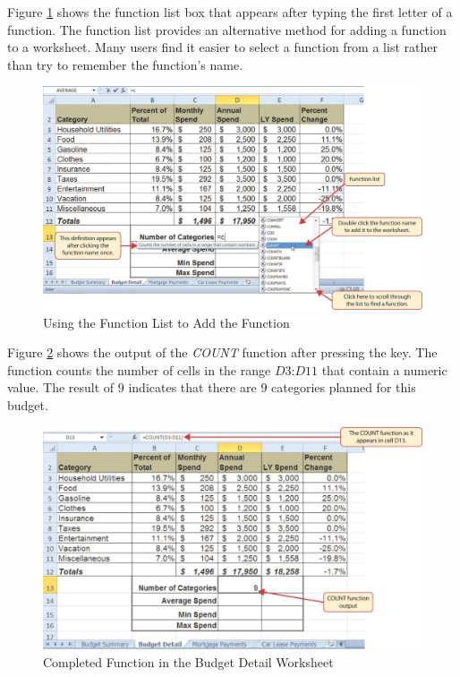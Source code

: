 Figure \ref{02:fig17} shows the function list box that appears after typing the first letter of a function. The function list provides an alternative method for adding a function to a worksheet. Many users find it easier to select a function from a list rather than try to remember the function's name.

\begin{figure}[H]
	\centering
	\includegraphics[width=\maxwidth{.95\linewidth}]{gfx/ch02_fig17}
	\caption{Using the Function List to Add the  Function}
	\label{02:fig17}
\end{figure}

Figure \ref{02:fig18} shows the output of the \textit{COUNT} function after pressing the  key. The function counts the number of cells in the range $ D3 $:$ D11 $ that contain a numeric value. The result of $ 9 $ indicates that there are $ 9 $ categories planned for this budget.

\begin{figure}[H]
	\centering
	\includegraphics[width=\maxwidth{.95\linewidth}]{gfx/ch02_fig18}
	\caption{Completed  Function in the Budget Detail Worksheet}
	\label{02:fig18}
\end{figure}

